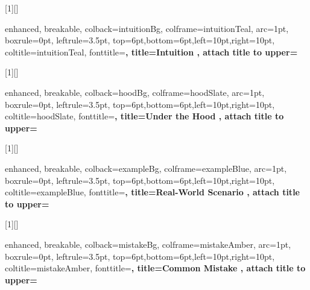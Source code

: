 

[1][]{
  enhanced,
  breakable,
  colback=intuitionBg,
  colframe=intuitionTeal,
  arc=1pt,
  boxrule=0pt,
  leftrule=3.5pt,
  top=6pt,bottom=6pt,left=10pt,right=10pt,
  coltitle=intuitionTeal,
  fonttitle=\sffamily\bfseries\small,
  title={Intuition },
  attach title to upper=\par\vspace{4pt}
}

[1][]{
  enhanced,
  breakable,
  colback=hoodBg,
  colframe=hoodSlate,
  arc=1pt,
  boxrule=0pt,
  leftrule=3.5pt,
  top=6pt,bottom=6pt,left=10pt,right=10pt,
  coltitle=hoodSlate,
  fonttitle=\sffamily\bfseries\small,
  title={Under the Hood },
  attach title to upper=\par\vspace{4pt}
}

[1][]{
  enhanced,
  breakable,
  colback=exampleBg,
  colframe=exampleBlue,
  arc=1pt,
  boxrule=0pt,
  leftrule=3.5pt,
  top=6pt,bottom=6pt,left=10pt,right=10pt,
  coltitle=exampleBlue,
  fonttitle=\sffamily\bfseries\small,
  title={Real-World Scenario },
  attach title to upper=\par\vspace{4pt}
}

[1][]{
  enhanced,
  breakable,
  colback=mistakeBg,
  colframe=mistakeAmber,
  arc=1pt,
  boxrule=0pt,
  leftrule=3.5pt,
  top=6pt,bottom=6pt,left=10pt,right=10pt,
  coltitle=mistakeAmber,
  fonttitle=\sffamily\bfseries\small,
  title={Common Mistake },
  attach title to upper=\par\vspace{4pt}
}


